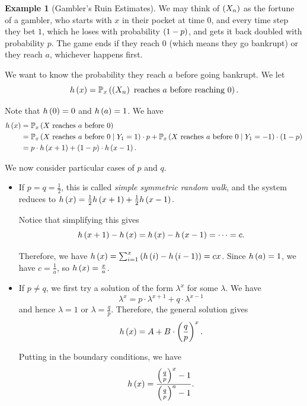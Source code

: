 \documentclass{article}
\theoremstyle{definition}
\newtheorem{example}[theorem]{Example}
\theoremstyle{remark}
\newcommand{\Prob}{\mathbb{P}}
\newcommand{\Conditional}[2]{#1\mid #2}
\begin{document}
\begin{example}[Gambler's Ruin Estimates]
    \label{ex:gambler-ruin-estimates}%
    We may think of \(\left(X_n\right)\) as the fortune of a gambler, who starts with \(x\) in their pocket at time \(0\), and every time step they bet \(1\), which he loses with probability \(\left(1 - p\right)\), and gets it back doubled with probability \(p\). The game ends if they reach \(0\) (which means they go bankrupt) or they reach \(a\), whichever happens first.

    We want to know the probability they reach \(a\) before going bankrupt. We let
    \[
        h\pqty{x} = \Prob_x \pqty{\pqty{X_n} \text{ reaches }a\text{ before reaching }0}.
    \]

    Note that \(h\left(0\right) = 0\) and \(h\left(a\right) = 1\). We have
    \begin{align*}
        h\pqty{x} &= \Prob_x \pqty{X \text{ reaches }a\text{ before }0} \\
        &= \Prob_x \pqty{\Conditional{X \text{ reaches }a\text{ before }0}{Y_1 = 1}} \cdot p + \Prob_x \pqty{\Conditional{X \text{ reaches }a\text{ before }0}{Y_1 = -1}} \cdot \pqty{1 - p} \\
        &= p \cdot h \pqty{x + 1} + \pqty{1 - p} \cdot h \pqty{x - 1}.
    \end{align*}

    We now consider particular cases of \(p\) and \(q\).

    \begin{itemize}
        \item If \(p = q = \frac{1}{2}\), this is called \emph{simple symmetric random walk}, and the system reduces to \(h\left(x\right) = \frac{1}{2} h \left(x + 1\right) + \frac{1}{2} h \left(x - 1\right)\).
        
        Notice that simplifying this gives
        \[
            h\left(x + 1\right) - h\left(x\right) = h\left(x\right) - h\left(x - 1\right) = \cdots = c.
        \]

        Therefore, we have \(h\left(x\right) = \sum_{i = 1}^{x} \left(h\left(i\right) - h\left(i - 1\right)\right) = cx\). Since \(h\left(a\right) = 1\), we have \(c = \frac{1}{a}\), so \(h\left(x\right) = \frac{x}{a}\).

        \item If \(p \neq q\), we first try a solution of the form \(\lambda^x\) for some \(\lambda\). We have
        \[
            \lambda^x = p \cdot \lambda^{x + 1} + q \cdot \lambda^{x - 1}
        \]
        and hence \(\lambda = 1\) or \(\lambda = \frac{q}{p}\). Therefore, the general solution gives
        \[
            h\left(x\right) = A + B \cdot \left(\frac{q}{p}\right)^x.
        \]

        Putting in the boundary conditions, we have
        \[
            h\left(x\right) = \frac{\left(\frac{q}{p}\right)^x - 1}{\left(\frac{q}{p}\right)^a - 1}.
        \]
    \end{itemize}
\end{example}
\end{document}
